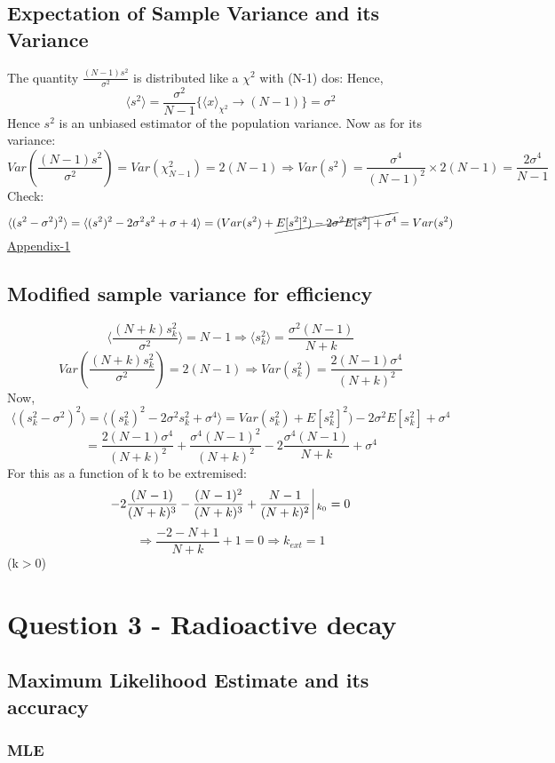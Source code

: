 \documentclass[11pt]{article}
\begin{document}
	\subsection{Expectation of Sample Variance and its Variance}
	
	 The quantity $\frac{(N-1)s^2}{\sigma^2}$ is distributed like a $\chi^2$ with (N-1) dos:
	 Hence,
	\[
		\boxed{\langle s^2 \rangle = \frac{\sigma^2}{N-1}\{\langle x\rangle_{\chi^2}\rightarrow (N-1)\} = \sigma^2}
	\]
	Hence $s^2$ is an unbiased estimator of the population variance.
	Now as for its variance:
	\[
		Var(\frac{(N-1)s^2}{\sigma^2}) = Var(\chi^2_{N-1}) = 2(N-1) \Rightarrow \boxed{Var(s^2) = \frac{\sigma^4}{(N-1)^2}\times 2(N-1) = \frac{2\sigma^4}{N-1}}
	\]
	Check:
	\[
		\langle (s^2-\sigma^2)^2\rangle = \langle (s^2)^2 -2\sigma^2 s^2 + \sigma+4  \rangle = (Var(s^2)+\cancel{E[s^2]^2) -2\sigma^2E[s^2] + \sigma^4} = Var(s^2)
	\]
	\hyperlink{page.8}{\Huge \color{red}Appendix-1}
	\subsection{Modified sample variance for efficiency}
	
	\[
		\langle \frac{(N+k)s_k^2}{\sigma^2}\rangle = N-1 \Rightarrow \boxed{\langle s_k^2\rangle = \frac{\sigma^2(N-1)}{N+k}}
 	\]
	\[
		Var(\frac{(N+k)s_k^2}{\sigma^2}) = 2(N-1) \Rightarrow \boxed{Var(s_k^2) = \frac{2(N-1)\sigma^4}{(N+k)^2}}
	\]
	Now,
	\[
		\boxed{\langle (s_k^2 - \sigma^2)^2 \rangle}  = \langle (s_k^2)^2  - 2\sigma^2 s_k^2 + \sigma^4 \rangle = Var(s_k^2) + E[s_k^2]^2)  - 2\sigma^2 E[s_k^2] + \sigma^4
	\]
	\[
		= \boxed{\frac{2(N-1)\sigma^4}{(N+k)^2} + \frac{\sigma^4(N-1)^2}{(N+k)^2} - 2\frac{\sigma^4(N-1)}{N+k} + \sigma^4}
	\]
	For this as a function of k to be extremised:
	\[
		-2\frac{(N-1)}{(N+k)^3} - \frac{(N-1)^2}{(N+k)^3} + \frac{N-1}{(N+k)^2} \, \vline_{\, \, k_0} = 0
	\]
	\[
		\Rightarrow \frac{-2-N+1}{N+k} + 1 = 0 \Rightarrow \boxed{ k_{ext} = 1}
	\](k$>0$)
	
	\section{\color{teal} Question 3 - Radioactive decay}
	
	\subsection{Maximum Likelihood Estimate and its accuracy}
	\subsubsection{MLE}
	
\end{document}
